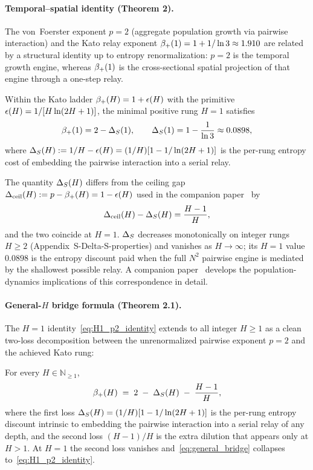 \paragraph{Temporal--spatial identity (Theorem 2).}
The von~Foerster exponent $p=2$ (aggregate population growth via pairwise
interaction) and the Kato relay exponent $\beta_+\!\left(1\right)=1+1/\ln 3 \approx 1.910$
are related by a structural identity up to entropy renormalization:
$p=2$ is the temporal growth engine, whereas $\beta_+\!\left(1\right)$ is the
cross-sectional spatial projection of that engine through a one-step relay.

\begin{theorem}
Within the Kato ladder $\beta_+\!\left(H\right)=1+\epsilon\!\left(H\right)$ with the primitive
$\epsilon\!\left(H\right)=1/[H\ln(2H+1)]$, the minimal positive rung $H=1$ satisfies
\begin{equation}
\beta_+\!\left(1\right)=2-\Delta_{S}(1),\qquad \Delta_{S}(1)=1-\frac{1}{\ln 3}\approx 0.0898,
\label{eq:H1_p2_identity}
\end{equation}
where $\Delta_{S}(H):= 1/H-\epsilon\!\left(H\right)=(1/H)[1-1/\ln(2H+1)]$ is the per-rung
entropy cost of embedding the pairwise interaction into a serial relay.
\end{theorem}

The quantity $\Delta_{S}(H)$ differs from the ceiling gap $\Delta_{\mathrm{ceil}}(H):=
p-\beta_+\!\left(H\right)=1-\epsilon\!\left(H\right)$ used in the companion paper~\cite{Kato2026c} by
\begin{equation}
\Delta_{\mathrm{ceil}}(H)-\Delta_{S}(H)=\frac{H-1}{H},
\label{eq:Dceil_DS_identity}
\end{equation}
and the two coincide at $H=1$.  $\Delta_{S}$ decreases monotonically on integer
rungs $H\ge 2$ (Appendix~\textsf{S-Delta-S-properties}) and vanishes as
$H\to\infty$; its $H=1$ value $0.0898$ is the entropy discount paid when
the full $N^{2}$ pairwise engine is mediated by the shallowest possible
relay.  A companion paper~\cite{Kato2026c} develops the population-dynamics
implications of this correspondence in detail.

\paragraph{General-$H$ bridge formula (Theorem 2.1).}
The $H=1$ identity~\eqref{eq:H1_p2_identity} extends to all integer $H\ge 1$
as a clean two-loss decomposition between the unrenormalized pairwise
exponent $p=2$ and the achieved Kato rung:

\begin{theorem}
For every $H\in\mathbb{N}_{\ge 1}$,
\begin{equation}
\beta_+\!\left(H\right)\;=\;2\;-\;\Delta_{S}(H)\;-\;\frac{H-1}{H},
\label{eq:general_bridge}
\end{equation}
where the first loss $\Delta_{S}(H)=(1/H)[1-1/\ln(2H+1)]$ is the per-rung entropy
discount intrinsic to embedding the pairwise interaction into a serial relay
of any depth, and the second loss $(H-1)/H$ is the extra dilution that
appears only at $H>1$.  At $H=1$ the second loss vanishes and~\eqref{eq:general_bridge}
collapses to~\eqref{eq:H1_p2_identity}.
\end{theorem}

